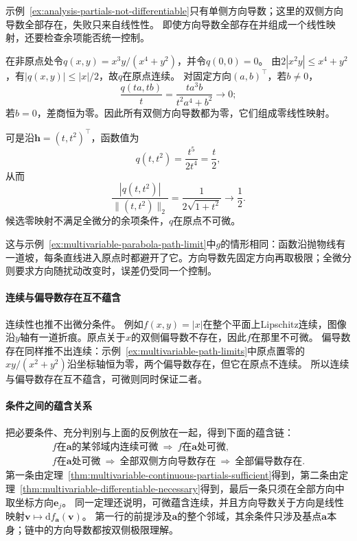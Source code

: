 示例~\ref{ex:analysis-partials-not-differentiable}只有单侧方向导数；这里的双侧方向导数全部存在，失败只来自线性性。
即使方向导数全部存在并组成一个线性映射，还要检查余项能否统一控制。
\begin{example}[方向导数全为零仍不可微]
\label{ex:multivariable-linear-directionals-not-differentiable}
在非原点处令$q(x,y)=x^3y/(x^4+y^2)$，并令$q(0,0)=0$。
由$2|x^2y|\leq x^4+y^2$，有$|q(x,y)|\leq|x|/2$，故$q$在原点连续。
对固定方向$(a,b)^\top$，若$b\neq0$，
\[
 \frac{q(ta,tb)}t=\frac{t a^3b}{t^2a^4+b^2}\longrightarrow0;
\]
若$b=0$，差商恒为零。因此所有双侧方向导数都为零，它们组成零线性映射。

可是沿$\bm h=(t,t^2)^\top$，函数值为
\[
 q(t,t^2)=\frac{t^5}{2t^4}=\frac t2,
\]
从而
\[
 \frac{|q(t,t^2)|}{\lVert(t,t^2)\rVert_2}
 =\frac1{2\sqrt{1+t^2}}\longrightarrow\frac12.
\]
候选零映射不满足全微分的余项条件，$q$在原点不可微。
\end{example}

这与示例~\ref{ex:multivariable-parabola-path-limit}中$g$的情形相同：函数沿抛物线有一道坡，每条直线进入原点时都避开了它。方向导数先固定方向再取极限；全微分则要求方向随扰动改变时，误差仍受同一个控制。

\paragraph{连续与偏导数存在互不蕴含}
连续性也推不出微分条件。
例如$f(x,y)=|x|$在整个平面上Lipschitz连续，图像沿$y$轴有一道折痕。原点关于$x$的双侧偏导数不存在，因此$f$在那里不可微。
偏导数存在同样推不出连续：示例~\ref{ex:multivariable-path-limits}中原点置零的$xy/(x^2+y^2)$沿坐标轴恒为零，两个偏导数存在，但它在原点不连续。
所以连续与偏导数存在互不蕴含，可微则同时保证二者。

\paragraph{条件之间的蕴含关系}
把必要条件、充分判别与上面的反例放在一起，得到下面的蕴含链：
\[
 \begin{gathered}
 f\text{在}\bm a\text{的某邻域内连续可微}
 \ \Longrightarrow\ f\text{在}\bm a\text{处可微},\\
 f\text{在}\bm a\text{处可微}
 \ \Longrightarrow\ \text{全部双侧方向导数存在}
 \ \Longrightarrow\ \text{全部偏导数存在}.
 \end{gathered}
\]
第一条由定理~\ref{thm:multivariable-continuous-partials-sufficient}得到，第二条由定理~\ref{thm:multivariable-differentiable-necessary}得到，最后一条只须在全部方向中取坐标方向$\bm e_j$。
同一定理还说明，可微蕴含连续，并且方向导数关于方向是线性映射$\bm v\mapsto\mathrm df_{\bm a}(\bm v)$。
第一行的前提涉及$\bm a$的整个邻域，其余条件只涉及基点$\bm a$本身；链中的方向导数都按双侧极限理解。

